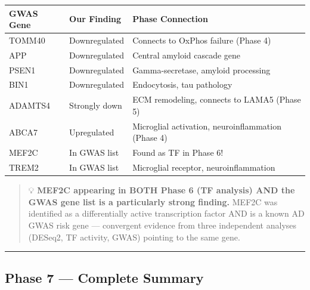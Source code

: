 \documentclass[
]{article}
\begin{document}
\begin{longtable}[]{@{}
  >{\raggedright\arraybackslash}p{}
  >{\raggedright\arraybackslash}p{}
  >{\raggedright\arraybackslash}p{}@{}}
\toprule\noalign{}
\begin{minipage}[b]{\linewidth}\raggedright
GWAS Gene
\end{minipage} & \begin{minipage}[b]{\linewidth}\raggedright
Our Finding
\end{minipage} & \begin{minipage}[b]{\linewidth}\raggedright
Phase Connection
\end{minipage} \\
\midrule\noalign{}
\endhead
\bottomrule\noalign{}
\endlastfoot
TOMM40 & Downregulated & Connects to OxPhos failure (Phase 4) \\
APP & Downregulated & Central amyloid cascade gene \\
PSEN1 & Downregulated & Gamma-secretase, amyloid processing \\
BIN1 & Downregulated & Endocytosis, tau pathology \\
ADAMTS4 & Strongly down & ECM remodeling, connects to LAMA5 (Phase 5) \\
ABCA7 & Upregulated & Microglial activation, neuroinflammation (Phase
4) \\
MEF2C & In GWAS list & Found as TF in Phase 6! \\
TREM2 & In GWAS list & Microglial receptor, neuroinflammation \\
\end{longtable}

\begin{quote}
💡 \textbf{MEF2C appearing in BOTH Phase 6 (TF analysis) AND the GWAS
gene list is a particularly strong finding.} MEF2C was identified as a
differentially active transcription factor AND is a known AD GWAS risk
gene --- convergent evidence from three independent analyses (DESeq2, TF
activity, GWAS) pointing to the same gene.
\end{quote}

\begin{center}\rule{0.5\linewidth}{0.5pt}\end{center}

\subsection{Phase 7 --- Complete
Summary}\label{phase-7-complete-summary}
\end{document}
